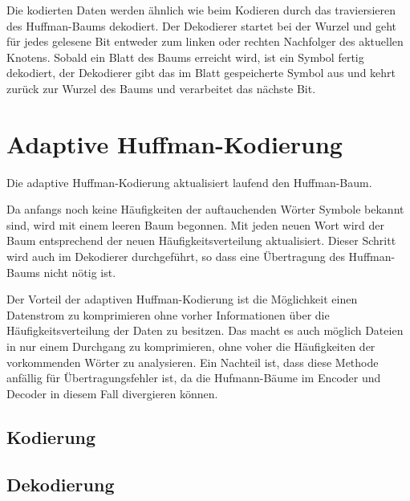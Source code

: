 \documentclass[twoside,11pt,a4paper]{article}
\theoremstyle{break}
\begin{document}
Die kodierten Daten werden ähnlich wie beim Kodieren durch das
traviersieren des Huffman-Baums dekodiert. Der Dekodierer startet bei
der Wurzel und geht für jedes gelesene Bit entweder zum linken oder
rechten Nachfolger des aktuellen Knotens. Sobald ein Blatt des Baums
erreicht wird, ist ein Symbol fertig dekodiert, der Dekodierer gibt
das im Blatt gespeicherte Symbol aus und kehrt zurück zur Wurzel des
Baums und verarbeitet das nächste Bit.



\section{Adaptive Huffman-Kodierung}
Die adaptive Huffman-Kodierung aktualisiert laufend den Huffman-Baum.

Da anfangs noch keine Häufigkeiten der auftauchenden Wörter Symbole
bekannt sind, wird mit einem leeren Baum begonnen. Mit jeden neuen
Wort wird der Baum entsprechend der neuen
Häufigkeitsverteilung aktualisiert. Dieser Schritt wird auch
im Dekodierer durchgeführt, so dass eine Übertragung des Huffman-Baums
nicht nötig ist.

Der Vorteil der adaptiven Huffman-Kodierung ist die Möglichkeit einen
Datenstrom zu komprimieren ohne vorher Informationen über die
Häufigkeitsverteilung der Daten zu besitzen. Das macht es auch möglich
Dateien in nur einem Durchgang zu komprimieren, ohne voher die
Häufigkeiten der vorkommenden Wörter zu analysieren. Ein Nachteil ist,
dass diese Methode anfällig für Übertragungsfehler ist, da die
Hufmann-Bäume im Encoder und Decoder in diesem Fall divergieren
können.

\subsection{Kodierung}

\subsection{Dekodierung}
\end{document}
